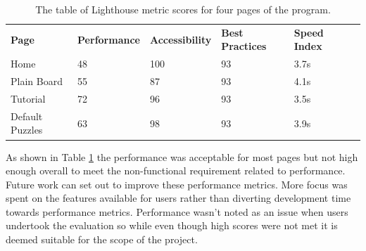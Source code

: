 \documentclass{l4proj}
\begin{document}
\begin{table}[]
    \caption{The table of Lighthouse metric scores for four pages of the program.}\label{tab:lighthouse}
    \begin{tabular}{llllll}
        \textbf{Page}            & \textbf{Performance} & \textbf{Accessibility} & \textbf{Best Practices} & \textbf{Speed Index} \\
        Home            & 48          & 100           & 93             & 3.7s                            \\
        Plain Board     & 55          & 87            & 93             & 4.1s                            \\
        Tutorial        & 72          & 96            & 93             & 3.5s                            \\
        Default Puzzles & 63          & 98            & 93             & 3.9s                           
    \end{tabular}
\end{table}

As shown in Table \ref{tab:lighthouse} the performance was acceptable for most pages but not high enough overall to meet the non-functional requirement related to performance. Future work can set out to improve these performance metrics. More focus was spent on the features available for users rather than diverting development time towards performance metrics. Performance wasn't noted as an issue when users undertook the evaluation so while even though high scores were not met it is deemed suitable for the scope of the project. 

\end{document}
